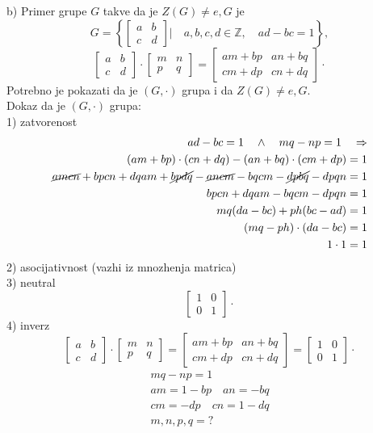 \documentclass[11pt]{article}
\newcommand\eng{\fontencoding{OT1}\fontfamily{\rmdefault}\selectfont}
\newcommand\srb{\fontencoding{OT2}\fontfamily{\rmdefault}\selectfont}
\newcommand{\bm}{\begin{bmatrix}}
\newcommand{\enm}{\end{bmatrix}}
\begin{document}
b) Primer grupe $G$ takve da je $Z(G)\not = e, G$ je\\
$$G=\left\{\bm a & b\\c & d \enm |\quad a,b,c,d\in\mathbb{Z},\quad ad-bc=1 \right\},$$
$$\bm a&b\\c&d \enm\cdot\bm m&n\\p&q \enm =\bm am+bp&an+bq\\cm+dp&cn+dq \enm\cdot$$
Potrebno je pokazati da je $(G,\cdot)$ grupa i da $Z(G)\not = e, G$.\\
\eng{\textbf{I)}}\srb{} Dokaz da je $(G,\cdot)$ grupa:\\
1) zatvorenost\\
\begin{align*}
    ad-bc=1 \quad\land\quad mq-np=1 \quad\Rightarrow \\
    (am+bp)\cdot(cn+dq)-(an+bq)\cdot(cm+dp)=1\\
    \cancel{amcn}+bpcn+dqam+\cancel{bpdq}-\cancel{ancm}-bqcm-\cancel{dpbq}-dpqn=1\\
    bpcn+dqam-bqcm-dpqn=1\\
    mq(da-bc)+ph(bc-ad)=1\\
    (mq-ph)\cdot(da-bc)=1\\
    1\cdot1=1
\end{align*}
2) asocijativnost (vazhi iz mnozhenja matrica)\\
3) neutral $$\bm 1&0\\0&1\enm\cdot$$
4) inverz
$$\bm a&b\\c&d \enm\cdot\bm m&n\\p&q \enm =\bm am+bp&an+bq\\cm+dp&cn+dq \enm=\bm 1&0\\0&1\enm\cdot$$
\begin{align*}
    mq-np=1\\
    am=1-bp\quad an=-bq\\
    cm=-dp\quad cn=1-dq\\
    m,n,p,q=?
\end{align*}
\end{document}
